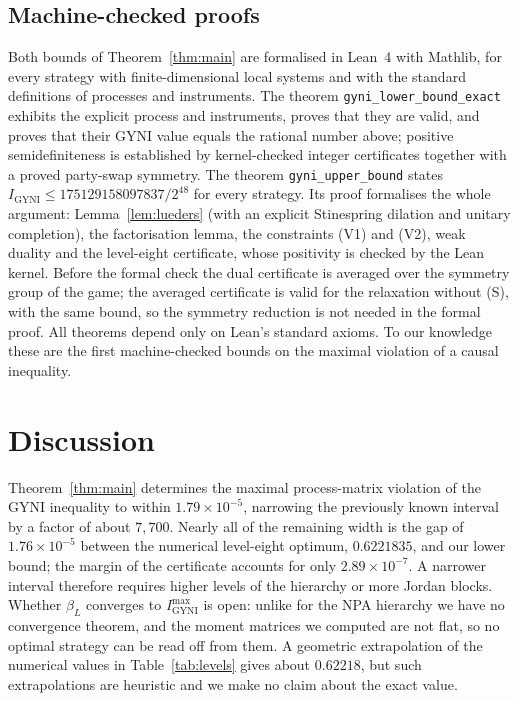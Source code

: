 \documentclass[11pt]{article}
\newcommand{\Igy}{I_{\mathrm{GYNI}}}
\newcommand{\Imax}{I_{\mathrm{GYNI}}^{\max}}
\begin{document}
\subsection*{Machine-checked proofs}
Both bounds of Theorem~\ref{thm:main} are formalised in Lean~4 with Mathlib, for every strategy with finite-dimensional local systems and with the standard definitions of processes and instruments. The theorem \texttt{gyni\_lower\_bound\_exact} exhibits the explicit process and instruments, proves that they are valid, and proves that their GYNI value equals the rational number above; positive semidefiniteness is established by kernel-checked integer certificates together with a proved party-swap symmetry. The theorem \texttt{gyni\_upper\_bound} states $\Igy\le175129158097837/2^{48}$ for every strategy. Its proof formalises the whole argument: Lemma~\ref{lem:lueders} (with an explicit Stinespring dilation and unitary completion), the factorisation lemma, the constraints (V1) and (V2), weak duality and the level-eight certificate, whose positivity is checked by the Lean kernel. Before the formal check the dual certificate is averaged over the symmetry group of the game; the averaged certificate is valid for the relaxation without (S), with the same bound, so the symmetry reduction is not needed in the formal proof. All theorems depend only on Lean's standard axioms. To our knowledge these are the first machine-checked bounds on the maximal violation of a causal inequality.

\section*{Discussion}

Theorem~\ref{thm:main} determines the maximal process-matrix violation of the GYNI inequality to within $1.79\times10^{-5}$, narrowing the previously known interval by a factor of about $7{,}700$. Nearly all of the remaining width is the gap of $1.76\times10^{-5}$ between the numerical level-eight optimum, $0.6221835$, and our lower bound; the margin of the certificate accounts for only $2.89\times10^{-7}$. A narrower interval therefore requires higher levels of the hierarchy or more Jordan blocks. Whether $\beta_L$ converges to $\Imax$ is open: unlike for the NPA hierarchy\cite{NPA2008} we have no convergence theorem, and the moment matrices we computed are not flat, so no optimal strategy can be read off from them. A geometric extrapolation of the numerical values in Table~\ref{tab:levels} gives about $0.62218$, but such extrapolations are heuristic and we make no claim about the exact value.
\end{document}
